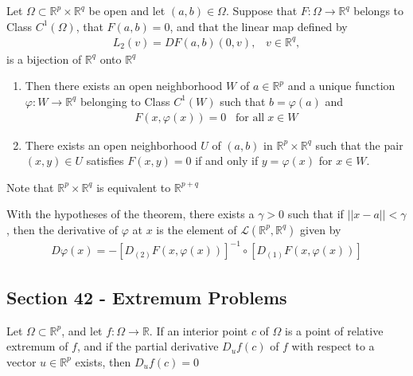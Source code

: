 \documentclass[12pt]{article}
\newcommand{\R}{\mathbb{R}}
\newenvironment{theorem}[2][Theorem]{\begin{trivlist}
\item[\hskip \labelsep {\bfseries #1}\hskip \labelsep {\bfseries #2.}]}{\end{trivlist}}
\newenvironment{corollary}[2][Corollary]{\begin{trivlist}
\item[\hskip \labelsep {\bfseries #1}\hskip \labelsep {\bfseries #2.}]}{\end{trivlist}}
\begin{document}
\begin{theorem}[Implicit Function]{Theorem}
Let $\Omega \subset \R^p \times \R^q$ be open and let $(a, b) \in \Omega$. Suppose that $F: \Omega \to \R^q$ belongs to Class $C^1(\Omega)$, that $F(a, b) = 0$, and that the linear map defined by
\begin{align*}
L_2(v) = DF(a, b)(0, v), \; \; \; v \in \R^q,
\end{align*}
is a bijection of $\R^q$ onto $\R^q$

\begin{enumerate}[label = \alph*)]
\item Then there exists an open neighborhood $W$ of $a \in \R^p$ and a unique function $\varphi: W \to \R^q$ belonging to Class $C^1(W)$ such that $b = \varphi(a)$ and 
\begin{align*}
F(x, \varphi(x)) = 0 \; \; \; \text{for all} \; x \in W
\end{align*}
\item There exists an open neighborhood $U$ of $(a, b)$ in $\R^p \times \R^q$ such that the pair $(x, y) \in U$ satisfies $F(x, y) = 0$ if and only if $y = \varphi(x)$ for $x \in W$.
\end{enumerate}

Note that $\R^p \times \R^q$ is equivalent to $\R^{p+q}$
\end{theorem}

\begin{corollary}{41.10}
With the hypotheses of the theorem, there exists a $\gamma > 0$ such that if $||x - a|| < \gamma$, then the derivative of $\varphi$ at $x$ is the element of $\mathscr{L}(\R^p, \R^q)$ given by
\begin{align*}
D\varphi(x) = -[D_{(2)}F(x, \varphi(x))]^{-1} \circ [D_{(1)}F(x, \varphi(x))]
\end{align*}
\end{corollary}

\subsection*{Section 42 - Extremum Problems}

\begin{theorem}{42.1}
Let $\Omega \subset \R^p$, and let $f: \Omega \to \R$. If an interior point $c$ of $\Omega$ is a point of relative extremum of $f$, and if the partial derivative $D_uf(c)$ of $f$ with respect to a vector $u \in \R^p$ exists, then $D_uf(c) = 0$
\end{theorem}
\end{document}

